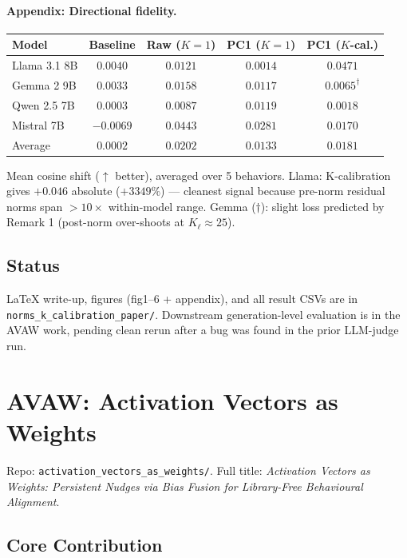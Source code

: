 \documentclass[11pt,a4paper]{article}
\begin{document}
\paragraph{Appendix: Directional fidelity.}
\begin{center}\small
\begin{tabular}{lcccc}
\toprule
Model & Baseline & Raw ($K{=}1$) & PC1 ($K{=}1$) & PC1 ($K$-cal.) \\
\midrule
Llama 3.1 8B  & $0.0040$ & $0.0121$ & $0.0014$ & $\mathbf{0.0471}$ \\
Gemma 2 9B    & $0.0033$ & $0.0158$ & $0.0117$ & $0.0065^{\dagger}$ \\
Qwen 2.5 7B   & $0.0003$ & $0.0087$ & $0.0119$ & $0.0018$ \\
Mistral 7B    & $-0.0069$ & $0.0443$ & $0.0281$ & $0.0170$ \\
\midrule
Average & $0.0002$ & $0.0202$ & $0.0133$ & $0.0181$ \\
\bottomrule
\end{tabular}
\end{center}
Mean cosine shift ($\uparrow$ better), averaged over 5 behaviors.
Llama: K-calibration gives $+0.046$ absolute ($+3349\%$) — cleanest signal
because pre-norm residual norms span $>10\times$ within-model range.
Gemma ($\dagger$): slight loss predicted by Remark 1 (post-norm over-shoots
at $K_\ell \approx 25$).

\subsection{Status}

LaTeX write-up, figures (fig1--6 + appendix), and all result CSVs are
in \texttt{norms\_k\_calibration\_paper/}.
Downstream generation-level evaluation is in the AVAW work, pending clean rerun after a bug was found in the prior LLM-judge run.

\section{AVAW: Activation Vectors as Weights}
\label{sec:paper2}

Repo: \texttt{activation\_vectors\_as\_weights/}.
Full title: \emph{Activation Vectors as Weights: Persistent Nudges via Bias
Fusion for Library-Free Behavioural Alignment}.

\subsection{Core Contribution}
\end{document}
